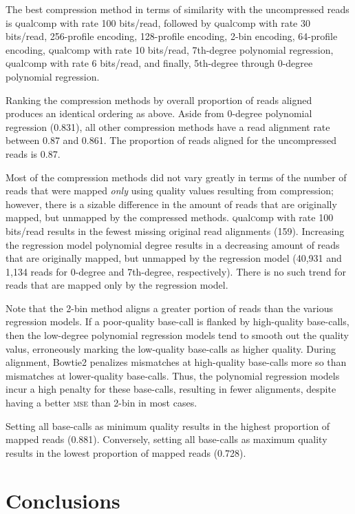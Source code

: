\documentclass{bmcart}
\begin{document}
The best compression method in terms of similarity with the
uncompressed reads is \textsc{q}ual\textsc{c}omp with rate 100
bits/read, followed by \textsc{q}ual\textsc{c}omp with rate 30
bits/read, 256-profile encoding, 128-profile encoding, 2-bin encoding,
64-profile encoding, \textsc{q}ual\textsc{c}omp with rate 10
bits/read, 7th-degree polynomial regression,
\textsc{q}ual\textsc{c}omp with rate 6 bits/read, and finally,
5th-degree through 0-degree polynomial regression.

Ranking the compression methods by overall proportion of reads aligned
produces an identical ordering as above. Aside from 0-degree
polynomial regression (0.831), all other compression methods have a
read alignment rate between 0.87 and 0.861. The proportion of reads
aligned for the uncompressed reads is 0.87.

Most of the compression methods did not vary greatly in terms of the
number of reads that were mapped \emph{only} using quality values
resulting from compression; however, there is a sizable difference in
the amount of reads that are originally mapped, but unmapped by the
compressed methods. \textsc{q}ual\textsc{c}omp with rate 100 bits/read
results in the fewest missing original read alignments
(159). Increasing the regression model polynomial degree results in a
decreasing amount of reads that are originally mapped, but unmapped by
the regression model (40,931 and 1,134 reads for 0-degree and
7th-degree, respectively). There is no such trend for reads that are
mapped only by the regression model.

Note that the 2-bin method aligns a greater portion of reads than the
various regression models. If a poor-quality base-call is flanked by
high-quality base-calls, then the low-degree polynomial regression
models tend to smooth out the quality valus, erroneously marking the
low-quality base-calls as higher quality. During alignment, Bowtie2
penalizes mismatches at high-quality base-calls more so than
mismatches at lower-quality base-calls. Thus, the polynomial
regression models incur a high penalty for these base-calls, resulting
in fewer alignments, despite having a better \textsc{mse} than 2-bin
in most cases.

Setting all base-calls as minimum quality results in the highest
proportion of mapped reads (0.881). Conversely, setting all base-calls
as maximum quality results in the lowest proportion of mapped reads
(0.728).

\section*{Conclusions}
\end{document}
